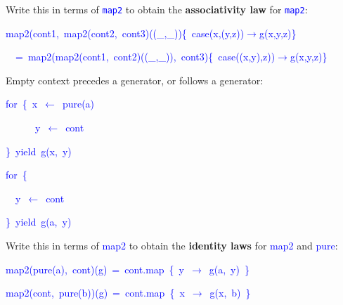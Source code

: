 Write this in terms of \texttt{\textcolor{blue}{\footnotesize{}map2}}
to obtain the \textbf{associativity law} for \texttt{\textcolor{blue}{\footnotesize{}map2}}:
\begin{lyxcode}
\vspace{-0.1cm}\textcolor{blue}{\footnotesize{}map2(cont1,~map2(cont2,~cont3)((\_,\_))\{~case(x,(y,z))$\rightarrow$g(x,y,z)\}}{\footnotesize\par}
\begin{lyxcode}
\textcolor{blue}{\footnotesize{}~~=~map2(map2(cont1,~cont2)((\_,\_)),~cont3)\{~case((x,y),z))$\rightarrow$g(x,y,z)\}}~
\end{lyxcode}
Empty context precedes a generator, or follows a generator:\textcolor{blue}{\footnotesize{}\smallskip{}
}{\footnotesize\par}

\textcolor{blue}{\footnotesize{}}%
\begin{minipage}[c][1\totalheight][t]{0.49\columnwidth}%
\begin{lyxcode}
\textcolor{blue}{\footnotesize{}for~\{~x~$\leftarrow$~pure(a)}{\footnotesize\par}

\textcolor{blue}{\footnotesize{}~~~~~~y~$\leftarrow$~cont}{\footnotesize\par}

\textcolor{blue}{\footnotesize{}\}~yield~g(x,~y)}{\footnotesize\par}
\end{lyxcode}
%
\end{minipage}\textcolor{blue}{\footnotesize{}\hfill{}}%
\begin{minipage}[c][1\totalheight][t]{0.49\columnwidth}%
\begin{lyxcode}
\textcolor{blue}{\footnotesize{}for~\{}{\footnotesize\par}

\textcolor{blue}{\footnotesize{}~~y~$\leftarrow$~cont}{\footnotesize\par}

\textcolor{blue}{\footnotesize{}\}~yield~g(a,~y)}{\footnotesize\par}
\end{lyxcode}
%
\end{minipage}\textcolor{blue}{\footnotesize{}\hfill{}\medskip{}
}{\footnotesize\par}

Write this in terms of \textcolor{blue}{\footnotesize{}map2} to obtain
the \textbf{identity laws} for \textcolor{blue}{\footnotesize{}map2}
and \textcolor{blue}{\footnotesize{}pure}:
\begin{lyxcode}
\vspace{-0.1cm}\textcolor{blue}{\footnotesize{}map2(pure(a),~cont)(g)~=~cont.map~\{~y~$\rightarrow$~g(a,~y)~\}}~

\textcolor{blue}{\footnotesize{}map2(cont,~pure(b))(g)~=~cont.map~\{~x~$\rightarrow$~g(x,~b)~\}}~
\end{lyxcode}
\end{lyxcode}


